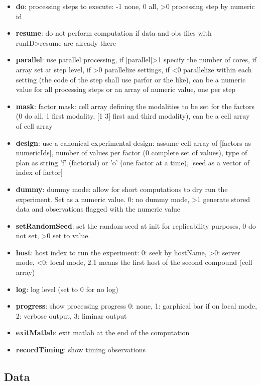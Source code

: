 \documentclass[a4paper,fleqn]{tufte-handout}
\begin{document}
\begin{itemize}
\item \textbf{do}: processing steps to execute: -1 none, 0 all, >0 processing step by numeric id
\item \textbf{resume}: do not perform computation if data and obs files with runID>resume are already there
\item \textbf{parallel}: use parallel processing, if |parallel|>1 specify the number of cores, if array set at step level, if >0 parallelize settings, if <0 parallelize within each setting (the code of the step shall use parfor or the like), can be a numeric value for all processing steps or an array of numeric value, one per step
\item \textbf{mask}: factor mask: cell array defining the modalities to be set for the factors (0 do all, 1 first modality, [1 3] first and third modality), can be a cell array of cell array

\item \textbf{design}: use a canonical experimental design: assume cell array of {[factors as numericIds], number of values per factor (0 complete set of values), type of plan as string 'f' (factorial) or 'o' (one factor at a time), [seed as a vector of index of factor]}
\item \textbf{dummy}:  dummy mode: allow for short computations to dry run the experiment. Set as a numeric value. 0: no dummy mode, >1 generate stored data and observations flagged with the numeric value
\item \textbf{setRandomSeed}: set the random seed at init for replicability purposes, 0 do not set, >0 set to value.
\item \textbf{host}: host index to run the experiment: 0: seek by hostName, >0: server mode, <0: local mode, 2.1 means the first host of the second compound (cell array)
\item \textbf{log}: log level (set to 0 for no log)
\item \textbf{progress}: show processing progress 0: none, 1: garphical bar if on local mode, 2: verbose output, 3: liminar output
\item \textbf{exitMatlab}: exit matlab at the end of the computation
\item \textbf{recordTiming}: show timing observations
\end{itemize}

\subsection{Data}
\end{document}

